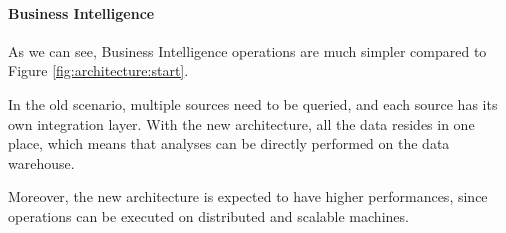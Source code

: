 \paragraph{Business Intelligence}
    As we can see, Business Intelligence operations are much simpler compared to Figure \ref{fig:architecture:start}.
    
    In the old scenario, multiple sources need to be queried, and each source has its own integration layer.
    With the new architecture, all the data resides in one place, which means that analyses can be directly performed on the data warehouse.
    
    Moreover, the new architecture is expected to have higher performances, since operations can be executed on distributed and scalable machines.